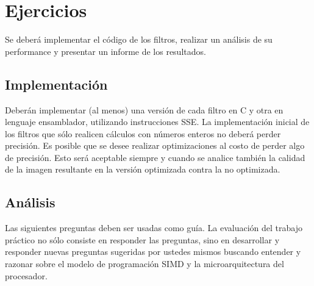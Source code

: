 \documentclass[a4paper, 12pt]{article}
\begin{document}


\section{Ejercicios}

Se deberá implementar el código de los filtros, realizar
un análisis de su performance y presentar un informe de los
resultados.

\subsection{Implementación}

Deberán implementar (al menos) una versión de cada filtro en C y otra en lenguaje ensamblador, utilizando instrucciones SSE.
La implementación inicial de los filtros que sólo realicen cálculos
con números enteros no deberá perder precisión. Es posible que se
desee realizar optimizaciones al costo de perder algo de precisión.
Esto será aceptable siempre y cuando se analice también la calidad
de la imagen resultante en la versión optimizada contra la no
optimizada.

\subsection{Análisis}

Las siguientes preguntas deben ser usadas como guía.
La evaluación del trabajo práctico no sólo consiste en responder
las preguntas, sino en desarrollar y responder nuevas preguntas
sugeridas por ustedes mismos buscando entender y razonar sobre
el modelo de programación SIMD y la microarquitectura del procesador.
\end{document}
